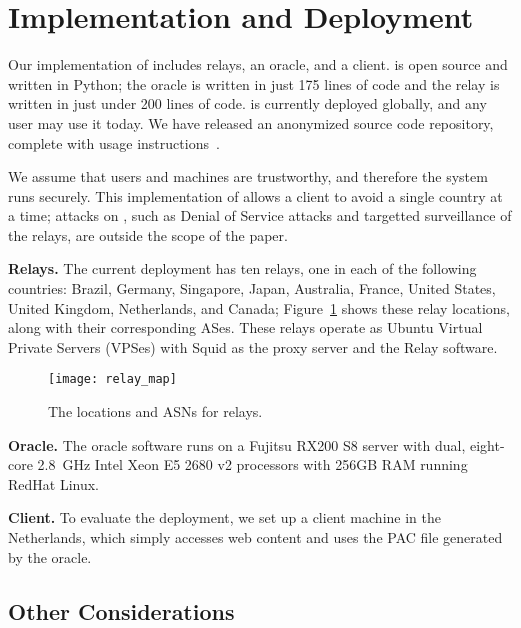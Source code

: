 \section{Implementation and Deployment}

Our implementation of \system{} includes relays, an oracle, and 
a client. \system{} is open source and written in Python; the oracle is written in just 
175 lines of code and the relay is written in just under 200 lines of code.  \system{} is currently deployed globally, and
any user may use it today.  We have released an anonymized source code repository,
complete with usage instructions~\cite{ran_system}.

We assume that users and machines are trustworthy, and therefore the system runs 
securely.  This implementation of \system{} allows a client to avoid a single country 
at a time; attacks on \system{}, such as Denial of Service attacks and targetted 
surveillance of the relays, are outside the scope of the paper.

{\bf Relays.}  The current deployment has ten relays, one in each
of the following
countries: Brazil,  Germany, Singapore, Japan, Australia, France, United
States, United Kingdom, Netherlands, and Canada; Figure~\ref{fig:relay_locations}
shows these relay locations, along with their corresponding ASes. These relays operate
as Ubuntu Virtual Private Servers (VPSes) with Squid as the proxy
server and the \system{} Relay software.

\begin{figure}[t!]
\centering
\texttt{[image: relay\_map]}
\caption{The locations and ASNs for \system{} relays.}
\label{fig:relay_locations}
\end{figure}

{\bf Oracle.}  The oracle software runs on a Fujitsu RX200 S8 server with dual, 
eight-core 2.8~GHz Intel Xeon E5 2680 v2 processors with 256GB RAM running 
RedHat Linux. 

{\bf Client.} To evaluate the \system{} deployment, we set up a client 
machine in the Netherlands, which simply accesses web content and uses the PAC 
file generated by the oracle. 

\subsection{Other Considerations}

